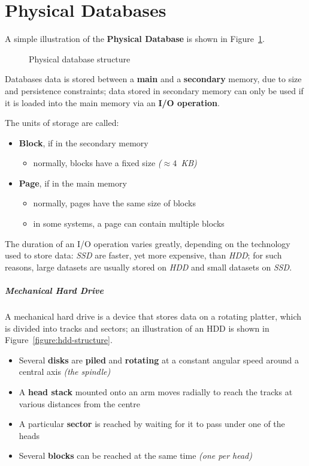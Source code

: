 \documentclass[english]{article}
\begin{document}
\clearpage

\section{Physical Databases}

A simple illustration of the \textbf{Physical Database} is shown in Figure~\ref{fig:physical-database}.

\begin{figure}[htbp]
  \centering
  \bigskip
  \caption{Physical database structure}
  \label{fig:physical-database}
  \bigskip
\end{figure}

Databases data is stored between a \textbf{main} and a \textbf{secondary} memory, due to size and persistence constraints;
data stored in secondary memory can only be used if it is loaded into the main memory via an \textbf{I/O operation}.

The units of storage are called:
\begin{itemize}
  \item \textbf{Block}, if in the secondary memory
        \begin{itemize}
          \item normally, blocks have a fixed size \textit{(\(\approx 4\,\) KB)}
        \end{itemize}
  \item \textbf{Page}, if in the main memory
        \begin{itemize}
          \item normally, pages have the same size of blocks
          \item in some systems, a page can contain multiple blocks
        \end{itemize}
\end{itemize}

The duration of an I/O operation varies greatly, depending on the technology used to store data:
\textit{SSD} are faster, yet more expensive, than \textit{HDD};
for such reasons, large datasets are usually stored on \textit{HDD} and small datasets on \textit{SSD}.

\subparagraph*{Mechanical Hard Drive}
A mechanical hard drive is a device that stores data on a rotating platter, which is divided into tracks and sectors;
an illustration of an HDD is shown in Figure~\ref{figure:hdd-structure}.

\begin{itemize}
  \item Several \textbf{disks} are \textbf{piled} and \textbf{rotating} at a constant angular speed around a central axis \textit{(the spindle)}
  \item A \textbf{head stack} mounted onto an arm moves radially to reach the tracks at various distances from the centre
  \item A particular \textbf{sector} is reached by waiting for it to pass under one of the heads
  \item Several \textbf{blocks} can be reached at the same time \textit{(one per head)}
\end{itemize}
\end{document}
